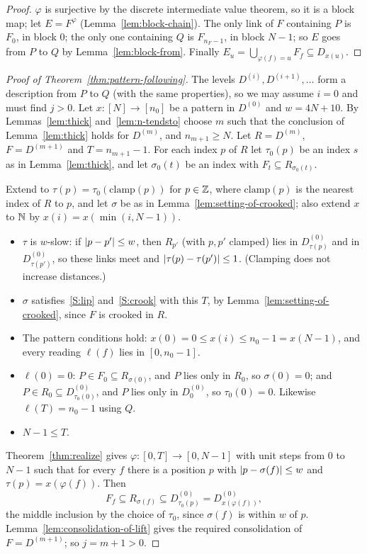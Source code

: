 \begin{proof}
$\varphi$ is surjective by the discrete intermediate value theorem, so it is a block map; let $E=F^\varphi$
(Lemma~\ref{lem:block-chain}). The only link of $F$ containing $P$ is $F_0$, in block $0$; the only one containing $Q$ is
$F_{n_F-1}$, in block $N-1$; so $E$ goes from $P$ to $Q$ by Lemma~\ref{lem:block-from}. Finally
$E_u=\bigcup_{\varphi(f)=u}F_f\subseteq D_{x(u)}$.
\end{proof}


\begin{proof}[Proof of Theorem~\ref{thm:pattern-following}]
The levels $D^{(i)},D^{(i+1)},\dots$ form a description from $P$ to $Q$ (with the same properties), so we may assume $i=0$
and must find $j>0$. Let $x\colon[N]\to[n_0]$ be a pattern in $D^{(0)}$ and $w=4N+10$. By Lemmas~\ref{lem:thick}
and~\ref{lem:n-tendsto} choose $m$ such that the conclusion of Lemma~\ref{lem:thick} holds for $D^{(m)}$, and $n_{m+1}\ge N$.
Let $R=D^{(m)}$, $F=D^{(m+1)}$ and $T=n_{m+1}-1$. For each index $p$ of $R$ let $\tau_0(p)$ be an index $s$ as in
Lemma~\ref{lem:thick}, and let $\sigma_0(t)$ be an index with $F_t\subseteq R_{\sigma_0(t)}$.

Extend to $\tau(p)=\tau_0(\text{clamp}(p))$ for $p\in\mathbb{Z}$, where $\text{clamp}(p)$ is the nearest index of $R$ to $p$, and
let $\sigma$ be as in Lemma~\ref{lem:setting-of-crooked}; also extend $x$ to $\mathbb{N}$ by $x(i)=x(\min(i,N-1))$.
\begin{itemize}
\item $\tau$ is $w$-slow: if $\left\lvert p-p'\right\rvert\le w$, then $R_{p'}$ (with $p,p'$ clamped) lies in $D^{(0)}_{\tau(p)}$ and in
$D^{(0)}_{\tau(p')}$, so these links meet and $\left\lvert \tau(p)-\tau(p')\right\rvert\le1$. (Clamping does not increase distances.)
\item $\sigma$ satisfies~\ref{S:lip} and~\ref{S:crook} with this $T$, by Lemma~\ref{lem:setting-of-crooked}, since $F$ is
crooked in $R$.
\item The pattern conditions hold: $x(0)=0\le x(i)\le n_0-1=x(N-1)$, and every reading $\ell(f)$ lies in $[0,n_0-1]$.
\item $\ell(0)=0$: $P\in F_0\subseteq R_{\sigma(0)}$, and $P$ lies only in $R_0$, so $\sigma(0)=0$; and $P\in R_0\subseteq
D^{(0)}_{\tau_0(0)}$, and $P$ lies only in $D^{(0)}_0$, so $\tau_0(0)=0$. Likewise $\ell(T)=n_0-1$ using $Q$.
\item $N-1\le T$.
\end{itemize}
Theorem~\ref{thm:realize} gives $\varphi\colon[0,T]\to[0,N-1]$ with unit steps from $0$ to $N-1$ such that for every $f$
there is a position $p$ with $\left\lvert p-\sigma(f)\right\rvert\le w$ and $\tau(p)=x(\varphi(f))$. Then
\[
F_f\subseteq R_{\sigma(f)}\subseteq D^{(0)}_{\tau_0(p)}=D^{(0)}_{x(\varphi(f))},
\]
the middle inclusion by the choice of $\tau_0$, since $\sigma(f)$ is within $w$ of $p$. Lemma~\ref{lem:consolidation-of-lift}
gives the required consolidation of $F=D^{(m+1)}$; so $j=m+1>0$.
\end{proof}

